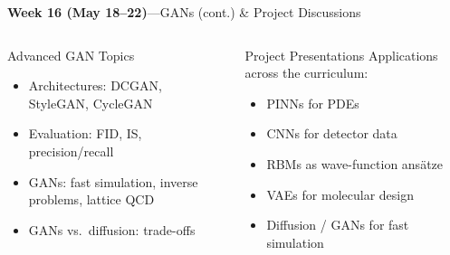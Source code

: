\documentclass[aspectratio=169,11pt]{beamer}
\begin{document}
\begin{frame}{{\color{mlgold}\textbf{Week 16 (May 18--22)}\;---\;GANs (cont.) \& Project Discussions}}
  \begin{columns}[T]
      \begin{block}{Advanced GAN Topics}
        \begin{itemize}\itemsep1pt
          \item Architectures: DCGAN, StyleGAN, CycleGAN
          \item Evaluation: FID, IS, precision/recall
          \item GANs: fast simulation,
                inverse problems, lattice QCD
          \item GANs vs.\ diffusion: trade-offs
        \end{itemize}
      \end{block}
      \begin{alertblock}{Project Presentations}
        Applications across the curriculum:
        \begin{itemize}\itemsep1pt
          \item PINNs for PDEs
          \item CNNs for detector data
          \item RBMs as wave-function ans\"{a}tze
          \item VAEs for molecular design
          \item Diffusion / GANs for fast simulation
        \end{itemize}
      \end{alertblock}
  \end{columns}
\end{frame}
\end{document}
